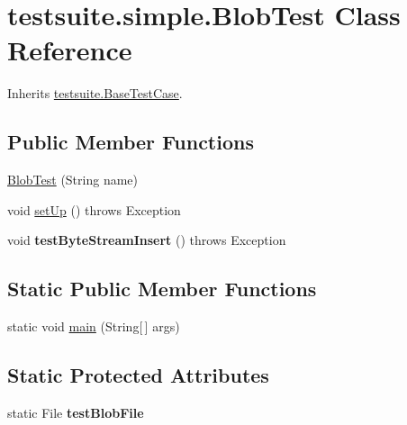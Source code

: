 \hypertarget{classtestsuite_1_1simple_1_1_blob_test}{}\section{testsuite.\+simple.\+Blob\+Test Class Reference}
\label{classtestsuite_1_1simple_1_1_blob_test}


Inherits \mbox{\hyperlink{classtestsuite_1_1_base_test_case}{testsuite.\+Base\+Test\+Case}}.

\subsection*{Public Member Functions}
\begin{DoxyCompactItemize}
\item 
\mbox{\hyperlink{classtestsuite_1_1simple_1_1_blob_test_a2741df6da9d07c3c6b8ba36abf15bc86}{Blob\+Test}} (String name)
\item 
void \mbox{\hyperlink{classtestsuite_1_1simple_1_1_blob_test_a81577d1e5c0481dee0a1b3f5638081df}{set\+Up}} ()  throws Exception 
\item 
\mbox{\label{classtestsuite_1_1simple_1_1_blob_test_a2b70339f4974639665b17564cd918834}} 
void {\bfseries test\+Byte\+Stream\+Insert} ()  throws Exception 
\end{DoxyCompactItemize}
\subsection*{Static Public Member Functions}
\begin{DoxyCompactItemize}
\item 
static void \mbox{\hyperlink{classtestsuite_1_1simple_1_1_blob_test_afda9a3e28dbbf808702dcf118e046ec6}{main}} (String\mbox{[}$\,$\mbox{]} args)
\end{DoxyCompactItemize}
\subsection*{Static Protected Attributes}
\begin{DoxyCompactItemize}
\item 
\mbox{\label{classtestsuite_1_1simple_1_1_blob_test_ad34fd4e4b861e58833e6ca9697db35bb}} 
static File {\bfseries test\+Blob\+File}
\end{DoxyCompactItemize}
